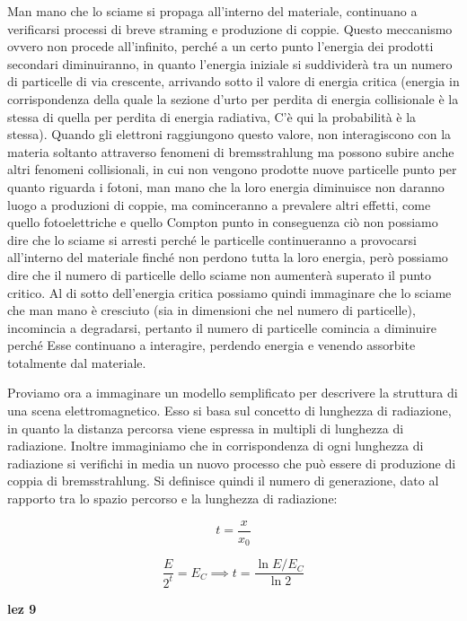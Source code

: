 Man mano che lo sciame si propaga all'interno del materiale, continuano a verificarsi processi di breve straming e produzione di coppie. Questo meccanismo ovvero non procede all'infinito, perché a un certo punto l'energia dei prodotti secondari diminuiranno, in quanto l'energia iniziale si suddividerà tra un numero di particelle di via crescente, arrivando sotto il valore di energia critica (energia in corrispondenza della quale la sezione d'urto per perdita di energia collisionale è la stessa di quella per perdita di energia radiativa, C'è qui la probabilità è la stessa). Quando gli elettroni raggiungono questo valore, non interagiscono con la materia soltanto attraverso fenomeni di bremsstrahlung ma possono subire anche altri fenomeni collisionali, in cui non vengono prodotte nuove particelle punto per quanto riguarda i fotoni, man mano che la loro energia diminuisce non daranno luogo a produzioni di coppie, ma cominceranno a prevalere altri effetti, come quello fotoelettriche e quello Compton punto in conseguenza ciò non possiamo dire che lo sciame si arresti perché le particelle continueranno a provocarsi all'interno del materiale finché non perdono tutta la loro energia, però possiamo dire che il numero di particelle dello sciame non aumenterà superato il punto critico. Al di sotto dell'energia critica possiamo quindi immaginare che lo sciame che man mano è cresciuto (sia in dimensioni che nel numero di particelle), incomincia a degradarsi, pertanto il numero di particelle comincia a diminuire perché Esse continuano a interagire, perdendo energia e venendo assorbite totalmente dal materiale.

Proviamo ora a immaginare un modello semplificato per descrivere la struttura di una scena elettromagnetico. Esso si basa sul concetto di lunghezza di radiazione, in quanto la distanza percorsa viene espressa in multipli di lunghezza di radiazione. Inoltre immaginiamo che in corrispondenza di ogni lunghezza di radiazione si verifichi in media un nuovo processo che può essere di produzione di coppia di bremsstrahlung. Si definisce quindi il numero di generazione, dato al rapporto tra lo spazio percorso e la lunghezza di radiazione:

$$t=\frac{x}{x_0}$$

$$\frac{E}{2^t}=E_C
\implies
t=\frac{\ln{E/E_C}}{\ln{2}}$$

\textbf{lez 9}

